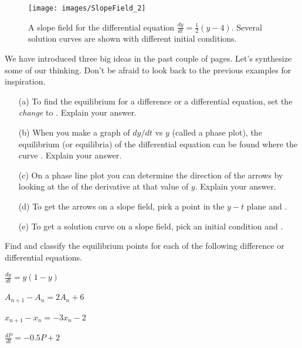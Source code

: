 \begin{figure}[ht!]
    \centering
    \texttt{[image: images/SlopeField\_2]}
    \caption{A slope field for the differential equation $\frac{dy}{dt} =
    \frac{1}{2}(y-4)$. Several solution curves are shown with different initial conditions. }
    \label{fig:slope_field_2}
\end{figure}


\begin{problem}
    We have introduced three big ideas in the past couple of pages.  Let's synthesize some
    of our thinking.  Don't be afraid to look back to the previous examples for
    inspiration.
    \begin{enumerate}
        \item[(a)] To find the equilibrium for a difference or a differential equation,
            set the {\it change} to \underline{\hspace{1in}}.  Explain your answer.
        \item[(b)] When you make a graph of $dy/dt$ vs $y$ (called a phase plot), the
            equilibrium (or equilibria) of the differential equation can be found where
            the curve \underline{\hspace{2in}}. Explain your answer.
        \item[(c)] On a phase line plot you can determine the direction of the arrows by
            looking at the \underline{\hspace{1in}} of the derivative at that value of
            $y$.  Explain your answer.
        \item[(d)] To get the arrows on a slope field, pick a point in the $y-t$ plane and
            \underline{\hspace{2in}}.  
        \item[(e)] To get a solution curve on a slope field, pick an initial condition and
            \underline{\hspace{2in}}.  
    \end{enumerate}
\end{problem}

\begin{problem}
    Find and classify the equilibrium points for each of the following difference or
    differential equations.
\ba
    \item $\displaystyle \frac{dy}{dt} = y(1-y)$
    \item $\displaystyle A_{n+1} - A_n = 2A_n + 6$
    \item $\displaystyle x_{n+1} - x_n = -3x_n - 2$
    \item $\displaystyle \frac{dP}{dt} = -0.5P + 2$
\ea
\end{problem}

